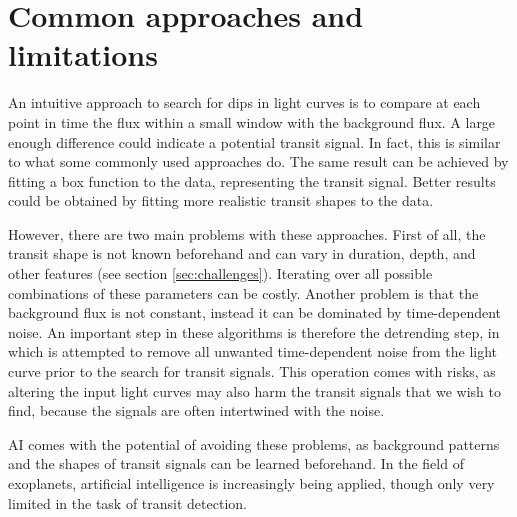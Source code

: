 
\section{Common approaches and limitations}

An intuitive approach to search for dips in light curves is to compare at each point in time the flux within a small window with the background flux. A large enough difference could indicate a potential transit signal. In fact, this is similar to what some commonly used approaches do. The same result can be achieved by fitting a box function to the data, representing the transit signal. Better results could be obtained by fitting more realistic transit shapes to the data. 

However, there are two main problems with these approaches. First of all, the transit shape is not known beforehand and can vary in duration, depth, and other features (see section \ref{sec:challenges}). Iterating over all possible combinations of these parameters can be costly. Another problem is that the background flux is not constant, instead it can be dominated by time-dependent noise. An important step in these algorithms is therefore the detrending step, in which is attempted to remove all unwanted time-dependent noise from the light curve prior to the search for transit signals. This operation comes with risks, as altering the input light curves may also harm the transit signals that we wish to find, because the signals are often intertwined with the noise. 

AI comes with the potential of avoiding these problems, as background patterns and the shapes of transit signals can be learned beforehand. In the field of exoplanets, artificial intelligence is increasingly being applied, though only very limited in the task of transit detection.
